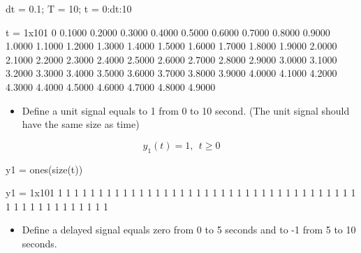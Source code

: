 \documentclass{article}
\begin{document}
\begin{matlabcode}
dt = 0.1; %
T = 10; %
t = 0:dt:10 %
\end{matlabcode}
\begin{matlaboutput}
t = 1x101    
         0    0.1000    0.2000    0.3000    0.4000    0.5000    0.6000    0.7000    0.8000    0.9000    1.0000    1.1000    1.2000    1.3000    1.4000    1.5000    1.6000    1.7000    1.8000    1.9000    2.0000    2.1000    2.2000    2.3000    2.4000    2.5000    2.6000    2.7000    2.8000    2.9000    3.0000    3.1000    3.2000    3.3000    3.4000    3.5000    3.6000    3.7000    3.8000    3.9000    4.0000    4.1000    4.2000    4.3000    4.4000    4.5000    4.6000    4.7000    4.8000    4.9000

\end{matlaboutput}


\begin{itemize}
\setlength{\itemsep}{-1ex}
   \item{\begin{flushleft} Define a unit signal equals to 1 from 0 to 10 second. (The unit signal should have the same size as time) \end{flushleft}}
\end{itemize}

\begin{par}
$$y_1 (t)=1,~~t\ge 0$$
\end{par}

\begin{matlabcode}
y1 = ones(size(t)) %
\end{matlabcode}
\begin{matlaboutput}
y1 = 1x101    
     1     1     1     1     1     1     1     1     1     1     1     1     1     1     1     1     1     1     1     1     1     1     1     1     1     1     1     1     1     1     1     1     1     1     1     1     1     1     1     1     1     1     1     1     1     1     1     1     1     1

\end{matlaboutput}


\begin{itemize}
\setlength{\itemsep}{-1ex}
   \item{\begin{flushleft} Define a delayed signal equals zero from 0 to 5 seconds and to -1 from 5 to 10 seconds. \end{flushleft}}
\end{itemize}
\end{document}
